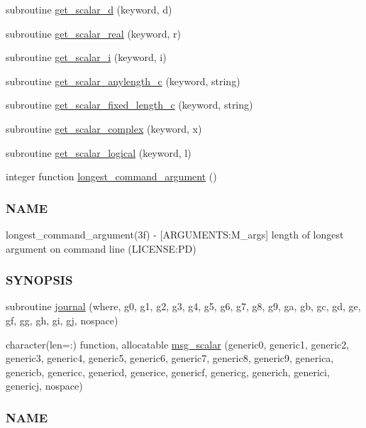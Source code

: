 \begin{DoxyCompactItemize}
\item 
subroutine \mbox{\hyperlink{namespacem__cli2_a338757660adde093db76b7d5559a1906}{get\+\_\+scalar\+\_\+d}} (keyword, d)
\item 
subroutine \mbox{\hyperlink{namespacem__cli2_ad089d91c66626de91bcda84523e80b54}{get\+\_\+scalar\+\_\+real}} (keyword, r)
\item 
subroutine \mbox{\hyperlink{namespacem__cli2_a9c5208ef6763da7e68dd1e118bea0b7a}{get\+\_\+scalar\+\_\+i}} (keyword, i)
\item 
subroutine \mbox{\hyperlink{namespacem__cli2_a7429381c83a021ba3ffb32ed58e17a0e}{get\+\_\+scalar\+\_\+anylength\+\_\+c}} (keyword, string)
\item 
subroutine \mbox{\hyperlink{namespacem__cli2_a9dcc99d34db1771959a1461274ae073e}{get\+\_\+scalar\+\_\+fixed\+\_\+length\+\_\+c}} (keyword, string)
\item 
subroutine \mbox{\hyperlink{namespacem__cli2_a2af4dd786acb5cb2dbd6e43667109490}{get\+\_\+scalar\+\_\+complex}} (keyword, x)
\item 
subroutine \mbox{\hyperlink{namespacem__cli2_a138d07d14246ee532ce36e67719e8c7d}{get\+\_\+scalar\+\_\+logical}} (keyword, l)
\item 
integer function \mbox{\hyperlink{namespacem__cli2_a7240f12031027172b87fde623bd77958}{longest\+\_\+command\+\_\+argument}} ()
\begin{DoxyCompactList}\small\item\em \subsubsection*{N\+A\+ME}

longest\+\_\+command\+\_\+argument(3f) -\/ \mbox{[}A\+R\+G\+U\+M\+E\+N\+TS\+:M\+\_\+args\mbox{]} length of longest argument on command line (L\+I\+C\+E\+N\+SE\+:PD) \subsubsection*{S\+Y\+N\+O\+P\+S\+IS}\end{DoxyCompactList}\item 
subroutine \mbox{\hyperlink{namespacem__cli2_a4c12c311327951984c6e1611da23cdfd}{journal}} (where, g0, g1, g2, g3, g4, g5, g6, g7, g8, g9, ga, gb, gc, gd, ge, gf, gg, gh, gi, gj, nospace)
\item 
character(len=\+:) function, allocatable \mbox{\hyperlink{namespacem__cli2_a737dc863a63dc101338840baad1cfd17}{msg\+\_\+scalar}} (generic0, generic1, generic2, generic3, generic4, generic5, generic6, generic7, generic8, generic9, generica, genericb, genericc, genericd, generice, genericf, genericg, generich, generici, genericj, nospace)
\begin{DoxyCompactList}\small\item\em \subsubsection*{N\+A\+ME}


\end{DoxyCompactList}
\end{DoxyCompactItemize}

